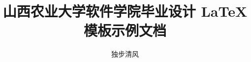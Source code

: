 \documentclass[fontset=adobe, openany, twoside]{sxaudocument}
\begin{document}
\title{山西农业大学软件学院毕业设计 \LaTeX 模板示例文档}
\author{独步清风\quad{}}

% 


\tableofcontents

\pagestyle{main}




\end{document}
